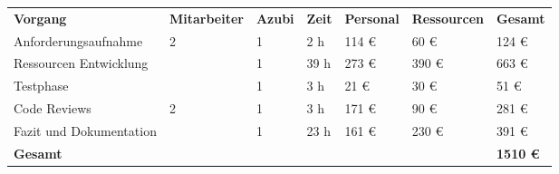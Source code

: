 \begin{tabu}{lllllll}
\rowfont{\bfseries\leavevmode\color{headingfont}}\textbf{Vorgang} & \textbf{Mitarbeiter} & \textbf{Azubi} & \textbf{Zeit} & \textbf{Personal} & \textbf{Ressourcen} & \textbf{Gesamt} \\
Anforderungsaufnahme & 2 & 1 & 2 h & 114 € & 60 € & 124 € \\
Ressourcen Entwicklung & \ & 1 & 39 h & 273 € & 390 € & 663 € \\ 
Testphase & \ & 1 & 3 h & 21 € & 30 € & 51 € \\
Code Reviews & 2 & 1 & 3 h & 171 € & 90 € & 281 € \\
Fazit und Dokumentation & \ & 1 & 23 h & 161 € & 230 € & 391 € \\
\hline
\hline
{}\textbf{Gesamt} & & & & & & \textbf{1510 €} \\
\end{tabu}
